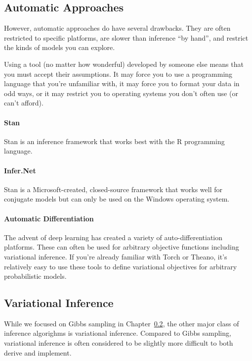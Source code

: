 \subsection{Automatic Approaches}

However, automatic approaches do have several drawbacks.  They are
often restricted to specific platforms, are slower than inference ``by
hand'', and restrict the kinds of models you can explore.

Using a tool (no matter how wonderful) developed by someone else means
that you must accept their assumptions.  It may force you to use a
programming language that you're unfamiliar with, it may force you to
format your data in odd ways, or it may restrict you to operating
systems you don't often use (or can't afford).


\paragraph{Stan}

Stan is an inference framework that works best with the R programming
language.

\paragraph{Infer.Net}

Stan is a Microsoft-created, closed-source framework that works well for conjugate
models but can only be used on the Windows operating system.

\paragraph{Automatic Differentiation}

The advent of deep learning has created a variety of
auto-differentiation platforms.  These can often be used for arbitrary
objective functions including variational inference.  If you're
already familiar with Torch or Theano, it's relatively easy to use
these tools to define variational objectives for arbitrary
probabilistic models.

\subsection{Variational Inference}

While we focused on Gibbs sampling in Chapter~\ref{}, the other major
class of inference algorighms is variational inference.  Compared to
Gibbs sampling, variational inference is often considered to be
slightly more difficult to both derive and implement.

